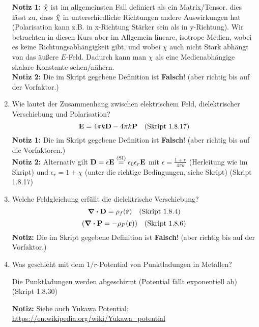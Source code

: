 \documentclass{scrartcl}
\begin{document}
\begin{enumerate}
\begin{center}
\begin{tabular}{lll}
          \end{tabular}
          \end{center}
          \textbf{Notiz 1:} $\vu \chi$ ist im allgemeinsten Fall 
          definiert als ein Matrix/Tensor.
          dies lässt zu, dass $\vu \chi$ in unterschiedliche Richtungen
          andere Auswirkungen hat (Polarisation kann z.B. in x-Richtung
          Stärker sein als in y-Richtung). Wir betrachten in diesen Kurs 
          aber im Allgemein
          lineare, isotrope Medien, wobei es keine Richtungsabhängigkeit
          gibt, und wobei $\chi$ auch nicht Stark abhängt von das äußere
          $E$-Feld. Dadurch kann
          man $\chi$ als eine Medienabhängige skalare Konstante 
          sehen/nähern.\\
          \textbf{Notiz 2:} Die im Skript gegebene Definition ist 
          \textbf{Falsch}! (aber richtig bis auf der Vorfaktor.)\\

    \item Wie lautet der Zusammenhang zwischen elektrischem Feld, 
          dielektrischer Verschiebung und Polarisation?
          $$\vb E= 4\pi k\vb D - 4\pi k\vb P \quad\text{(Skript 1.8.17)}$$
          \textbf{Notiz 1:} Die im Skript gegebene Definition ist 
          \textbf{Falsch}! (aber richtig bis auf die Vorfaktoren.)\\
          \textbf{Notiz 2:} Alternativ gilt $\vb D=\epsilon \vb E
          \stackrel{\text{(SI)}}=\epsilon_0\epsilon_r \vb E$ mit
          $\epsilon=\frac{1+\chi}{4\pi k}$ (Herleitung wie im Skript) und
          $\epsilon_r=1+\chi$
          (unter die richtige Bedingungen, siehe Skript) (Skript 1.8.17)\\

    \item Welche Feldgleichung erfüllt die dielektrische Verschiebung?
          $$\div \vb D=\rho_f(\vb r)\quad\text{(Skript 1.8.4)}$$
          $$\qty(\div \vb P=-\rho_P(\vb r))\quad\text{(Skript 1.8.6)}$$
          \textbf{Notiz:} Die im Skript gegebene Definition ist 
          \textbf{Falsch}! (aber richtig bis auf der Vorfaktor.)

    \item Was geschieht mit dem $1/r$-Potential von Punktladungen in
          Metallen?
          \begin{center}
            Die Punktladungen werden abgeschirmt (Potential fällt 
            exponentiell ab)
            (Skript 1.8.30)
          \end{center}
          \textbf{Notiz:} Siehe auch Yukawa Potential: 
          \url{https://en.wikipedia.org/wiki/Yukawa_potential} 


\end{enumerate}
\end{document}
